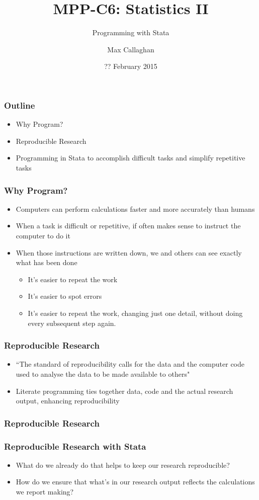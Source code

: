 \documentclass{beamer}
\title{MPP-C6: Statistics II}
\subtitle{Programming with Stata}
\author{Max Callaghan}
\institute[HSoG]{Hertie School of Governance}
\date{?? February 2015}
\begin{document}
\frame{\titlepage}

\begin{frame}
  \frametitle{Outline}
  \begin{itemize}
    \item Why Program?
    \item Reproducible Research
    \item Programming in Stata to accomplish difficult tasks and simplify repetitive tasks
  \end{itemize}
\end{frame}

\begin{frame}
  \frametitle{Why Program?}
  \begin{itemize}
    \item Computers can perform calculations faster and more accurately than humans
    \item When a task is difficult or repetitive, if often makes sense to instruct the computer to do it
    \item When those instructions are written down, we and others can see exactly what has been done
    \begin{itemize}
      \item It's easier to repeat the work
      \item It's easier to spot errors
      \item It's easier to repeat the work, changing just one detail, without doing every subsequent step again.
    \end{itemize}
  \end{itemize}
\end{frame}

\begin{frame}
  \frametitle{Reproducible Research}
  \begin{itemize}
    \item ``The standard of reproducibility calls for the data and the computer code used to analyse the data to be made available to others" \cite{peng}
    \item Literate programming ties together data, code and the actual research output, enhancing reproducibility
  \end{itemize}
\end{frame}

\begin{frame}
  \frametitle{Reproducible Research}
  \frametitle{Reproducible Research with Stata}
  \begin{itemize}
    \item What do we already do that helps to keep our research reproducible?
    \item How do we ensure that what's in our research output reflects the calculations we report making?
  \end{itemize}
\end{frame}
\end{document}
